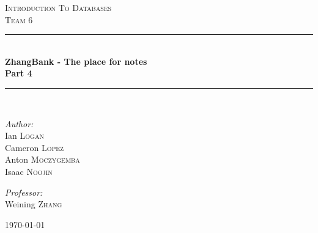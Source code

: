 \begin{titlepage}
 
\begin{center}
\newcommand{\HRule}{\rule{\linewidth}{0.5mm}} 
 
 
\textsc{\LARGE Introduction To Databases}\\[1.5cm]
 
\textsc{\Large Team 6}\\[0.5cm]
 
\HRule \\[0.4cm]
{ \huge \bfseries ZhangBank - The place for notes\\Part 4}\\[0.4cm]
 
\HRule \\[1.5cm]
 
\begin{minipage}{0.4\textwidth}
\begin{flushleft} \large
\emph{Author:}\\
Ian \textsc{Logan}\\ Cameron \textsc{Lopez}\\ Anton
\textsc{Moczygemba}\\ Isaac \textsc{Noojin}
\end{flushleft}
\end{minipage}
\begin{minipage}{0.4\textwidth}
\begin{flushright} \large
\emph{Professor:} \\
Weining \textsc{Zhang}
\end{flushright}
\end{minipage}
 
\vfill
 
{\large \today}
 
\end{center}
 
\end{titlepage}